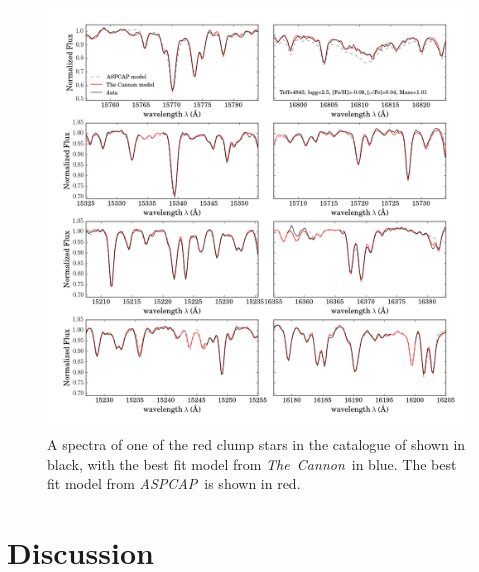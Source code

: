 \documentclass[12pt, preprint]{aastex}
\newcommand{\project}[1]{\textsl{#1}}
\newcommand{\thecannon}{\project{The~Cannon}}
\newcommand{\tc}{\project{The~Cannon}}
\newcommand{\apogee}{\project{APOGEE}}
\newcommand{\aspcap}{\project{ASPCAP}}
\begin{document}
\begin{figure}[p!]
\centering
      \includegraphics[scale=0.5]{./plots/spectra_fits_7.png}
  \caption{A spectra of one of the red clump stars in the catalogue of \citet{Bovy2014} shown in black, with the best fit model from \tc\ in blue. The best fit model from \aspcap\ is shown in red.}
\label{fig:spectra}
\end{figure}


\section{Discussion}

\end{document}
